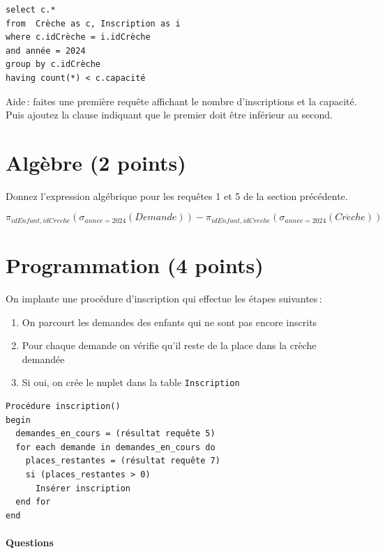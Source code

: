\begin{enumerate}
\begin{solution}
\begin{small}
\begin{verbatim}
select c.*
from  Crèche as c, Inscription as i
where c.idCrèche = i.idCrèche
and année = 2024
group by c.idCrèche
having count(*) < c.capacité
\end{verbatim}
\end{small}
\end{solution}
   Aide\,: faites une première requête affichant le nombre d'inscriptions
      et  la capacité. Puis ajoutez la clause indiquant que le premier doit
      être inférieur au second.
\end{enumerate}
 

\section{Algèbre (2 points)}

Donnez l'expression algébrique pour les requêtes 1 et  5 de la section précédente.


\begin{solution}
$$\pi_{idEnfant,idCreche} (\sigma_{annee=2024} (Demande)) - \pi_{idEnfant,idCreche} (\sigma_{annee=2024} (Cr\acute{e}che))$$
\end{solution}

\section{Programmation (4 points)}

On implante une procédure d'inscription qui effectue les étapes suivantes\,:

\begin{enumerate}
  \item On parcourt les demandes des enfants qui ne sont pas encore inscrits
  \item Pour chaque demande on vérifie qu'il reste de la place dans la crèche demandée
  \item Si oui, on crée le nuplet dans la table \texttt{Inscription}
\end{enumerate}

\begin{verbatim}
Procédure inscription()
begin
  demandes_en_cours = (résultat requête 5)
  for each demande in demandes_en_cours do
    places_restantes = (résultat requête 7)
    si (places_restantes > 0)
      Insérer inscription
  end for
end
\end{verbatim}
\paragraph{Questions}


